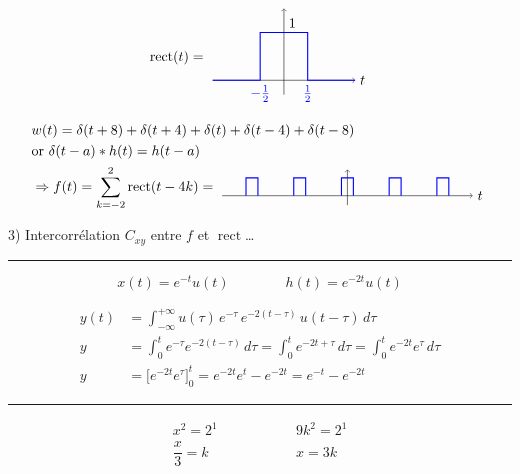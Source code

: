 \documentclass[11pt]{article}
\DeclareMathOperator{\rect}{rect}
\begin{document}
\[
\rect(t) =
\vcenter{\hbox{
\begin{tikzpicture}[scale=1.2]
  \draw[->] (-1.5,0) -- (1.5,0) node[right] {$t$};
  \draw[->] (0,-0.3) -- (0,1.5);
  \draw[blue, thick] (-1.5,0) -- (-0.5,0) -- (-0.5,1) -- (0.5,1) -- (0.5,0) -- (1.5,0);
  \node[blue, below] at (-0.5,0) {$-\tfrac12$};
  \node[blue, below] at (0.5,0) {$\tfrac12$};
  \node[above right] at (0,1) {$1$};
\end{tikzpicture}}}
\]

\begin{align*}
& w(t) = \delta(t+8) + \delta(t+4) + \delta(t) + \delta(t-4) + \delta(t-8) \\
& \text{or } \delta(t-a) * h(t) = h(t-a) \\
& \Rightarrow f(t) = \sum_{k=-2}^{2} \rect(t - 4k) =
\vcenter{\hbox{
\begin{tikzpicture}[scale=0.3]
  \draw[->] (-10.5,0) -- (10.5,0) node[right] {$t$};
  \draw[->] (0,-0.8) -- (0,2.2);
  \foreach \c in {-8,-4,0,4,8} {
    \draw[blue, thick] (\c-0.5,0) -- (\c-0.5,1.5) -- (\c+0.5,1.5) -- (\c+0.5,0);
  }
\end{tikzpicture}}}
\end{align*}

3) Intercorrélation $C_{xy}$ entre $f$ et $\rect$\ldots

\medskip
\noindent\rule{\linewidth}{0.4pt}

\[
x(t) = e^{-t} u(t) \qquad\qquad h(t) = e^{-2t} u(t)
\]

\begin{align*}
y(t) &= \int_{-\infty}^{+\infty} u(\tau)\, e^{-\tau}\, e^{-2(t-\tau)}\, u(t-\tau)\, d\tau \\[4pt]
y &= \int_0^t e^{-\tau} e^{-2(t-\tau)}\, d\tau
   = \int_0^t e^{-2t+\tau}\, d\tau
   = \int_0^t e^{-2t} e^{\tau}\, d\tau \\[4pt]
y &= \Big[ e^{-2t} e^{\tau} \Big]_0^t = e^{-2t} e^{t} - e^{-2t} = e^{-t} - e^{-2t}
\end{align*}

\noindent\rule{\linewidth}{0.4pt}

\[
\begin{array}{lcl}
x^2 = 2^1 & \qquad\qquad & 9k^2 = 2^1 \\[10pt]
\dfrac{x}{3} = k & & x = 3k
\end{array}
\]
\end{document}
